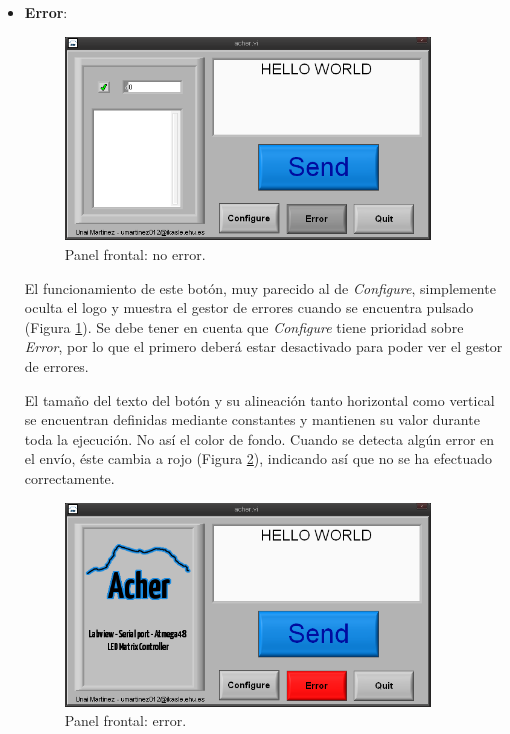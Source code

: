 \begin{itemize}
{El tamaño del texto del botón y su alineación tanto horizontal como vertical se encuentran definidas mediante constantes.
}

\item{\textbf{Error}:

\begin{figure}[!htp]
\centering
\includegraphics[width=275pt]{./images/acher_err1.png}
\caption{Panel frontal: no error.}
\label{fig:acher_err1}
\end{figure}

El funcionamiento de este botón, muy parecido al de \textit{Configure}, simplemente oculta el logo y muestra el gestor de errores cuando se encuentra pulsado (Figura \ref{fig:acher_err1}). Se debe tener en cuenta que \textit{Configure} tiene prioridad sobre \textit{Error}, por lo que el primero deberá estar desactivado para poder ver el gestor de errores.

El tamaño del texto del botón y su alineación tanto horizontal como vertical se encuentran definidas mediante constantes y mantienen su valor durante toda la ejecución. No así el color de fondo. Cuando se detecta algún error en el envío, éste cambia a rojo (Figura \ref{fig:acher_err2}), indicando así que no se ha efectuado correctamente.

\begin{figure}[!htp]
\centering
\includegraphics[width=275pt]{./images/acher_err2.png}
\caption{Panel frontal: error.}
\label{fig:acher_err2}
\end{figure}

}
\end{itemize}
